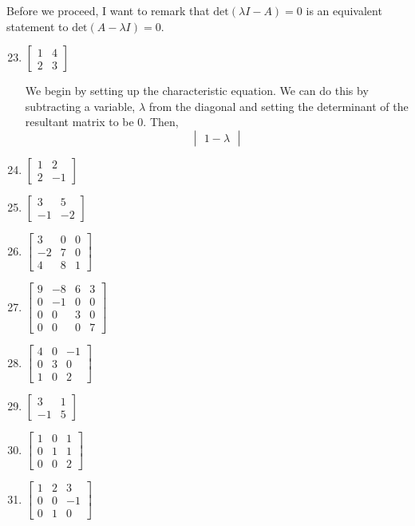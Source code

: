 \documentclass{article}
\begin{document}
Before we proceed, I want to remark that \(\text{det}(\lambda I - A) = 0 \) is an equivalent statement to \(\text{det}(A - \lambda I) =0\). 
\begin{enumerate}
    \setcounter{enumi}{22}
    \item \(\begin{bmatrix}
        1&4\\2&3 
    \end{bmatrix}\)\begin{solution}
        We begin by setting up the characteristic equation. We can do this by subtracting a variable, \(\lambda\) from the diagonal and setting the determinant of the resultant matrix to be 0. Then,\[
            \begin{vmatrix}
                1 - \lambda 
            \end{vmatrix}    
        \]
    \end{solution}
    \item \(\begin{bmatrix}
        1&2\\2&-1 
    \end{bmatrix}\)
    \item \(\begin{bmatrix}
        3&5\\-1&-2 
    \end{bmatrix}\)
    \item \(\begin{bmatrix}
        3&0&0\\-2&7&0\\4&8&1 
    \end{bmatrix}\)
    \item \(\begin{bmatrix}
        9&-8&6&3\\0&-1&0&0\\0&0&3&0\\0&0&0&7 
    \end{bmatrix}\)
    \item \(\begin{bmatrix}
        4&0&-1\\0&3&0\\1&0&2 
    \end{bmatrix}\)
    \item \(\begin{bmatrix}
        3&1 \\ -1&5
    \end{bmatrix}\)
    \item \(\begin{bmatrix}
        1&0&1\\0&1&1\\0&0&2 
    \end{bmatrix}\)
    \item \(\begin{bmatrix}
        1&2&3\\0&0&-1\\0&1&0 
    \end{bmatrix}\)
\end{enumerate}
\end{document}

